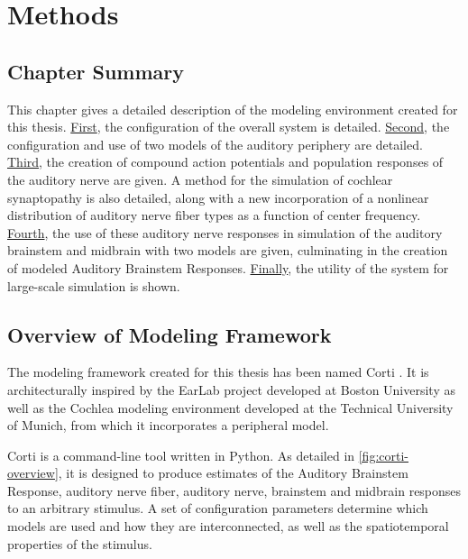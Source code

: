 \chapter{Methods}
\label{chapter:Methods}
\thispagestyle{myheadings}

\graphicspath{{4_Methods/Figures/}}

\section{Chapter Summary} %
\label{sec:methodsummary}
This chapter gives a detailed description of the modeling environment created for this thesis.  \hyperref[sec:overview_of_modeling_framework]{First}, the configuration of the overall system is detailed.  \hyperref[sec:peripheral_models]{Second}, the configuration and use of two models of the auditory periphery are detailed.  \hyperref[sec:auditory_nerve_response_models]{Third}, the creation of compound action potentials and population responses of the auditory nerve are given.  A method for the simulation of cochlear synaptopathy is also detailed, along with a new incorporation of a nonlinear distribution of auditory nerve fiber types as a function of center frequency.  \hyperref[sec:brainstem_models]{Fourth}, the use of these auditory nerve responses in simulation of the auditory brainstem and midbrain with two models are given, culminating in the creation of modeled Auditory Brainstem Responses.  \hyperref[sec:automated_parameter_exploration]{Finally}, the utility of the system for large-scale simulation is shown. 


\section{Overview of Modeling Framework} %
\label{sec:overview_of_modeling_framework}
The modeling framework created for this thesis has been named Corti \citep{Voysey2016Corti}. It is architecturally inspired by the EarLab project developed at Boston University as well as the Cochlea \citep{Rudnicki2014Cochlea} modeling environment developed at the Technical University of Munich, from which it incorporates a peripheral model.

Corti is a command-line tool written in Python. As detailed in \autoref{fig:corti-overview}, it is designed to produce estimates of the Auditory Brainstem Response, auditory nerve fiber, auditory nerve, brainstem and midbrain responses to an arbitrary stimulus.  A set of configuration parameters determine which models are used and how they are interconnected, as well as the spatiotemporal properties of the stimulus.

